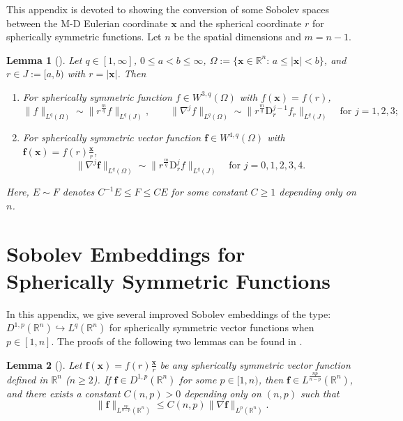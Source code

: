 \documentclass[11pt,reqno]{amsart}
\newtheorem{lem}{Lemma}[section]
\numberwithin{rk}{section}
\numberwithin{prop}{section}
\numberwithin{mydef}{section}
\numberwithin{lem}{section}
\numberwithin{equation}{section}
\numberwithin{thm}{section}
\begin{document}
This appendix is devoted to showing the conversion of some Sobolev spaces between the M-D Eulerian coordinate $\boldsymbol{x}$ and the spherical coordinate $r$ for spherically symmetric functions. 
Let $n$ be the spatial dimensions and $m=n-1$.


\begin{lem}[\cite{CZZ1}]\label{lemma-initial}
Let $q\in [1,\infty]$, $0\leq a<b\leq \infty$, $\Omega:=\{\boldsymbol{x}\in \mathbb{R}^n:\, a\leq |\boldsymbol{x}|< b\}$, and $r\in J:=[a,b)$ with $r=|\boldsymbol{x}|$. 
Then
\begin{enumerate}
\item[$\mathrm{(i)}$] For spherically symmetric function $f\in W^{3,q}(\Omega)$ with $f(\boldsymbol{x})=f(r)$,  
\begin{equation*} 
\|f\|_{L^q(\Omega)} \sim 
\|r^\frac{m}{q}f\|_{L^q(J)},\qquad \|\nabla^j f\|_{L^q(\Omega)} \sim 
\|r^\frac{m}{q}\mathrm{D}_r^{j-1}f_r\|_{L^q(J)} \quad \text{for $j=1,2,3$};
\end{equation*}
\item[$\mathrm{(ii)}$] For spherically symmetric vector function $\boldsymbol{f}\in W^{4,q}(\Omega)$ with $\boldsymbol{f}(\boldsymbol{x})=f(r)\frac{\boldsymbol{x}}{r}$,
\begin{equation*}
\|\nabla^j\boldsymbol{f}\|_{L^q(\Omega)} \sim \|r^\frac{m}{q}\mathrm{D}_r^jf\|_{L^q(J)} \quad \text{for $j=0,1,2,3,4$}.
\end{equation*}
\end{enumerate}
Here, $E\sim F$ denotes $C^{-1}E\leq F\leq CE$ for some constant $C\geq 1$ depending only on $n$.
\end{lem}




\section{Sobolev Embeddings for Spherically Symmetric Functions}\label{improve-sobolev}

In this appendix, we give several improved Sobolev embeddings of the type: $D^{1,p}(\mathbb{R}^n)\hookrightarrow L^{q}(\mathbb{R}^n)$ for spherically symmetric vector functions when $p\in [1,n]$. The proofs of the following two lemmas can be found in \cite[Appendix C]{CZZ1}.

\begin{lem}[\cite{CZZ1}]\label{lemma-L6}
Let $\boldsymbol{f}(\boldsymbol{x})=f(r)\frac{\boldsymbol{x}}{r}$ be any spherically symmetric vector function defined in $\mathbb{R}^n$ {\rm(}$n\geq 2${\rm)}. If $\boldsymbol{f}\in D^{1,p}(\mathbb{R}^n)$ for some $p\in [1,n)$, then $\boldsymbol{f}\in L^\frac{np}{n-p}(\mathbb{R}^n)$, and there exists a constant $C(n,p)>0$ depending only on $(n,p)$ such that 
\begin{equation}\label{ineq-L6}
\|\boldsymbol{f}\|_{L^\frac{np}{n-p}(\mathbb{R}^n)}\leq C(n,p)\|\nabla \boldsymbol{f}\|_{L^p(\mathbb{R}^n)}.
\end{equation}
\end{lem}
\end{document}

